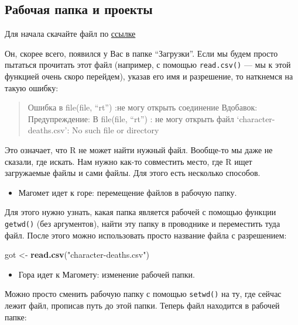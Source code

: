 \documentclass[]{book}
\newenvironment{Shaded}{\begin{snugshade}}{\end{snugshade}}
\newcommand{\KeywordTok}[1]{\textcolor[rgb]{0.13,0.29,0.53}{\textbf{#1}}}
\newcommand{\NormalTok}[1]{#1}
\newcommand{\StringTok}[1]{\textcolor[rgb]{0.31,0.60,0.02}{#1}}
\providecommand{\tightlist}{%
  \setlength{\itemsep}{0pt}\setlength{\parskip}{0pt}}
\begin{document}
\hypertarget{wd}{%
\subsection{Рабочая папка и проекты}\label{wd}}

Для начала скачайте файл по \href{https://raw.githubusercontent.com/Pozdniakov/stats/master/data/character-deaths.csv}{ссылке}

Он, скорее всего, появился у Вас в папке ``Загрузки''. Если мы будем просто пытаться прочитать этот файл (например, с помощью \texttt{read.csv()} --- мы к этой функцией очень скоро перейдем), указав его имя и разрешение, то наткнемся на такую ошибку:

\begin{quote}
Ошибка в file(file, ``rt'') :не могу открыть соединение
Вдобавок: Предупреждение:
В file(file, ``rt'') :
не могу открыть файл `character-deaths.csv': No such file or directory
\end{quote}

Это означает, что R не может найти нужный файл. Вообще-то мы даже не сказали, где искать. Нам нужно как-то совместить место, где R ищет загружаемые файлы и сами файлы. Для этого есть несколько способов.

\begin{itemize}
\tightlist
\item
  Магомет идет к горе: перемещение файлов в рабочую папку.
\end{itemize}

Для этого нужно узнать, какая папка является рабочей с помощью функции \texttt{getwd()} (без аргументов), найти эту папку в проводнике и переместить туда файл. После этого можно использовать просто название файла с разрешением:

\begin{Shaded}
\begin{Highlighting}[]
\NormalTok{got <-}\StringTok{ }\KeywordTok{read.csv}\NormalTok{(}\StringTok{"character-deaths.csv"}\NormalTok{)}
\end{Highlighting}
\end{Shaded}

\begin{itemize}
\tightlist
\item
  Гора идет к Магомету: изменение рабочей папки.
\end{itemize}

Можно просто сменить рабочую папку с помощью \texttt{setwd()} на ту, где сейчас лежит файл, прописав путь до этой папки. Теперь файл находится в рабочей папке:
\end{document}
